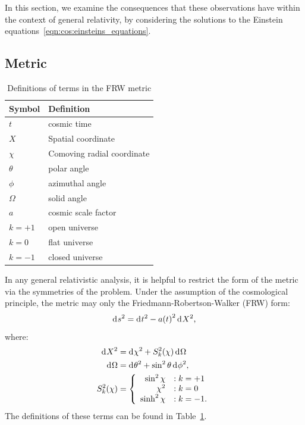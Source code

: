 In this section, we examine the consequences that these observations have within the context of general relativity, by considering the solutions to the Einstein equations~\ref{eqn:cos:einsteins_equations}.

\subsection{Metric}
\begin{table}
  \centering
\begin{tabular}{ll}
 \toprule
  Symbol & Definition \\
 \midrule
 \midrule
  $t$ & cosmic time \\
  $X$ & Spatial coordinate \\
  $\chi$ & Comoving radial coordinate \\
  $\theta$ & polar angle \\
  $\phi$ & azimuthal angle \\
  $\Omega$ & solid angle \\
  $a$ & cosmic scale factor \\
  $k=+1$ & open universe \\
  $k=0$ & flat universe \\
  $k=-1$ & closed universe \\
 \bottomrule
\end{tabular}
\caption{Definitions of terms in the FRW metric}\label{tab:cos:metric}
\end{table}

In any general relativistic analysis, it is helpful to restrict the form of the metric via the symmetries of the problem.
Under the assumption of the cosmological principle, the metric may only the Friedmann-Robertson-Walker (FRW) form:
\begin{equation}
  \operatorname{d}^{}\!{s}^2 = \operatorname{d}^{}\!{t}^2 - a{(t)}^2 \operatorname{d}^{}\!{X}^2,
  \label{eqn:cos:FRW_metric}
\end{equation}
where:
\begin{align}
  \operatorname{d}^{}\!{X}^2 &= \operatorname{d}^{}\!{\chi}^2 + S_k^2{(\chi)} \operatorname{d}^{}\!{\Omega}
  \label{eqn:cos:space_element}\\
  \operatorname{d}^{}\!{\Omega} &= \operatorname{d}^{}\!{\theta}^2 + \sin^2\theta \operatorname{d}^{}\!{\phi}^2,
  \label{eqn:cos:angle_element}\\
  S_k^2(\chi) &=
  \left\{
  \begin{array}{rl}
    \sin^2\chi &: k=+1 \\
    \chi^2 &: k=0 \\
    \sinh^2\chi &: k=-1. \\
  \end{array}
  \right.\label{eqn:cos:S_def}
\end{align}
The definitions of these terms can be found in Table~\ref{tab:cos:metric}. 

